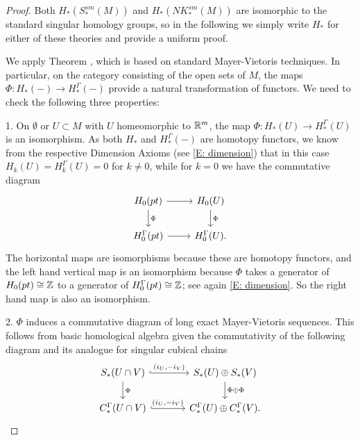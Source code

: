\begin{proof}
	Both $H_*(S^{sm}_*(M))$ and $H_*(NK^{sm}_*(M))$ are isomorphic to the standard singular homology groups, so in the following we simply write $H_*$ for either of these theories and provide a uniform proof.

	We apply Theorem \cite[5.1.1]{Frie20}, which is based on standard Mayer-Vietoris techniques.
	In particular, on the category consisting of the open sets of $M$, the maps $\Phi: H_*(-) \to H_*^\Gamma(-)$ provide a natural transformation of functors.
	We need to check the following three properties:

	1.
	On $\emptyset$ or $U \subset M$ with $U$ homeomorphic to $\mathbb{R}^m$, the map $\Phi: H_*(U) \to H_*^\Gamma(U)$ is an isomorphism.
	As both $H_*$ and $H_*^\Gamma(-)$ are homotopy functors, we know from the respective Dimension Axioms (see \cref{E: dimension}) that in this case $H_k(U) = H_k^\Gamma(U) = 0$ for $k\neq 0$, while for $k = 0$ we have the commutative diagram
	\[
	\begin{tikzcd}
		H_0(pt) \arrow[r] \arrow[d, "\Phi"] & H_0(U) \arrow[d, "\Phi"] \\
		H_0^\Gamma(pt) \arrow[r] & H^\Gamma_0(U).
	\end{tikzcd}
	\]
	The horizontal maps are isomorphisms because these are homotopy functors, and the left hand vertical map is an isomorphism because $\Phi$ takes a generator of $H_0(pt) \cong \mathbb{Z}$ to a generator of $H_0^\Gamma(pt) \cong \mathbb{Z}$; see again \cref{E: dimension}.
	So the right hand map is also an isomorphism.

	2.
	$\Phi$ induces a commutative diagram of long exact Mayer-Vietoris sequences.
	This follows from basic homological algebra given the commutativity of the following diagram and its analogue for singular cubical chains
	\[
	\begin{tikzcd}[column sep=large]
		S_*(U \cap V) \arrow[r, "{(i_U, -i_V)}", hook] \arrow[d, "\Phi"] & S_*(U) \oplus S_*(V) \arrow[d, "\Phi \oplus \Phi"] \\
		C_*^\Gamma(U \cap V) \arrow[r, "{(i_U, -i_V)}", hook] & C_*^\Gamma(U) \oplus C_*^\Gamma(V).
	\end{tikzcd}
	\]


\end{proof}

